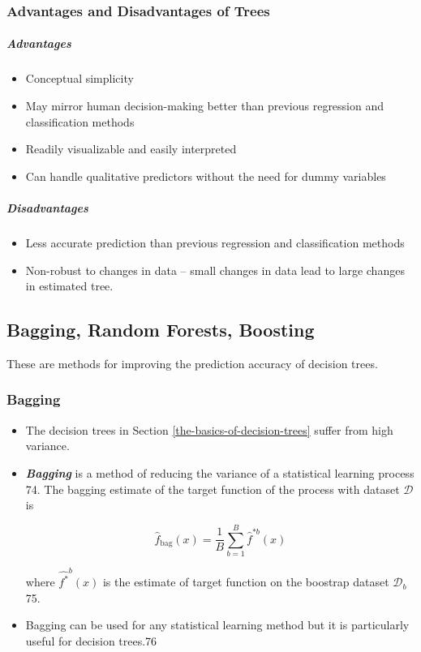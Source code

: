 \documentclass[11pt]{article}
\providecommand{\tightlist}{%
      \setlength{\itemsep}{0pt}\setlength{\parskip}{0pt}}
\begin{document}
    \hypertarget{advantages-and-disadvantages-of-trees}{%
\subsubsection{Advantages and Disadvantages of
Trees}\label{advantages-and-disadvantages-of-trees}}

    \hypertarget{advantages}{%
\subparagraph{Advantages}\label{advantages}}

    \begin{itemize}
\tightlist
\item
  Conceptual simplicity
\item
  May mirror human decision-making better than previous regression and
  classification methods
\item
  Readily visualizable and easily interpreted
\item
  Can handle qualitative predictors without the need for dummy variables
\end{itemize}

    \hypertarget{disadvantages}{%
\subparagraph{Disadvantages}\label{disadvantages}}

    \begin{itemize}
\tightlist
\item
  Less accurate prediction than previous regression and classification
  methods
\item
  Non-robust to changes in data -- small changes in data lead to large
  changes in estimated tree.
\end{itemize}

    \hypertarget{bagging-random-forests-boosting}{%
\subsection{Bagging, Random Forests,
Boosting}\label{bagging-random-forests-boosting}}

    These are methods for improving the prediction accuracy of decision
trees.

    \hypertarget{bagging}{%
\subsubsection{Bagging}\label{bagging}}

    \begin{itemize}
\item
  The decision trees in Section \ref{the-basics-of-decision-trees}
  suffer from high variance.
\item
  \textbf{\emph{Bagging}} is a method of reducing the variance of a
  statistical learning process 74. The bagging estimate of the target
  function of the process with dataset \(\mathcal{D}\) is

  \[\hat{f}_{\text{bag}}(x) = \frac{1}{B} \sum_{b = 1}^B \hat{f}^{*b}(x) \]

  where \(\hat{f^*}^b(x)\) is the estimate of target function on the
  boostrap dataset \(\mathcal{D}_b\) 75.
\item
  Bagging can be used for any statistical learning method but it is
  particularly useful for decision trees.76
\end{itemize}
\end{document}

